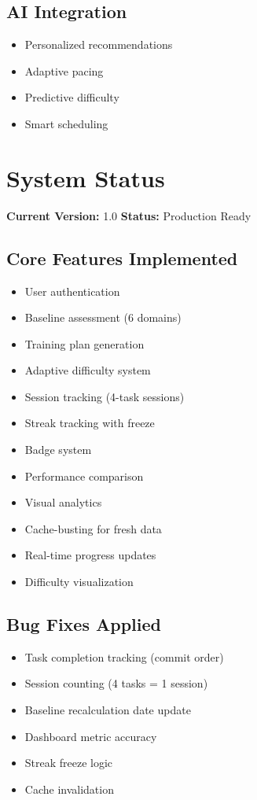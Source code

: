 \documentclass[12pt,a4paper]{article}
\begin{document}
\subsection{AI Integration}
\begin{itemize}
    \item Personalized recommendations
    \item Adaptive pacing
    \item Predictive difficulty
    \item Smart scheduling
\end{itemize}

\section{System Status}

\textbf{Current Version:} 1.0  
\textbf{Status:} Production Ready

\subsection{Core Features Implemented}
\begin{itemize}
    \item User authentication
    \item Baseline assessment (6 domains)
    \item Training plan generation
    \item Adaptive difficulty system
    \item Session tracking (4-task sessions)
    \item Streak tracking with freeze
    \item Badge system
    \item Performance comparison
    \item Visual analytics
    \item Cache-busting for fresh data
    \item Real-time progress updates
    \item Difficulty visualization
\end{itemize}

\subsection{Bug Fixes Applied}
\begin{itemize}
    \item Task completion tracking (commit order)
    \item Session counting (4 tasks = 1 session)
    \item Baseline recalculation date update
    \item Dashboard metric accuracy
    \item Streak freeze logic
    \item Cache invalidation
\end{itemize}
\end{document}
